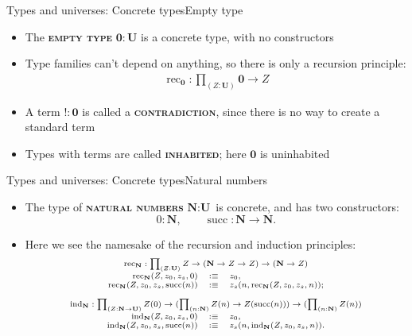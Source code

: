\documentclass{beamer}
\newcommand{\defn}[1]{{\scshape\bfseries\color{MPBemph}#1}}
\newcommand{\eql}{\mathbin{:\equiv}}
\newcommand{\U}{\textbf{U}}
\newcommand{\tpi}[1]{\prod_{(#1)}}
\DeclareMathOperator{\rec}{rec}
\DeclareMathOperator{\ind}{ind}
\newcommand{\1}{\textbf{1}}
\newcommand{\0}{\mathbf{0}}
\newcommand{\2}{\textbf{2}}
\newcommand{\N}{\textbf{N}}
\renewcommand{\succ}{\operatorname{succ}}
\begin{document}
\begin{frame}{Types and universes: Concrete types}{Empty type}
\begin{itemize}[<+- >]
	\item The \defn{empty type} \( \0 : \U \) is a concrete type, with no constructors
	\item Type families can't depend on anything, so there is only a recursion principle:
	\[ \begin{array}{c}
		\rec_{\0} : \tpi{Z : \U} \0 \to Z
	\end{array} \]
	\item A term \( {!} : \0 \) is called a \defn{contradiction}, since there is no way to create a standard term
	\item Types with terms are called \defn{inhabited}; here \( \0 \) is uninhabited
\end{itemize} \end{frame}
\begin{frame}{Types and universes: Concrete types}{Natural numbers}
\begin{itemize}[<+- >]
	\item The type of \defn{natural numbers} \( \N : \U \) is concrete, and has two constructors:
	\[ 0 : \N, \hspace{2em} \succ : \N \to \N. \]
	\item Here we see the namesake of the recursion and induction principles:
	\[\scriptsize \begin{array}{c}
		\rec_{\N} : \tpi{Z : \U} Z \to (\N \to Z \to Z) \to (\N \to Z) \\[3pt]
		\begin{array}{rcl}
			\rec_{\N}(Z, z_{0}, z_{s}, 0) &\eql& z_{0}, \\
			\rec_{\N}(Z, z_{0}, z_{s}, \succ(n)) &\eql& z_{s}(n, \rec_{\N}(Z, z_{0}, z_{s}, n));
		\end{array} \\[12pt]
		\ind_{\N} : \tpi{Z : \N \to \U} Z(0) \to (\tpi{n : \N} Z(n) \to Z(\succ(n))) \to (\tpi{n : \N} Z(n)) \\[3pt]
		\begin{array}{rcl}
			\ind_{\N}(Z, z_{0}, z_{s}, 0) &\eql& z_{0}, \\
			\ind_{\N}(Z, z_{0}, z_{s}, \succ(n)) &\eql& z_{s}(n, \ind_{\N}(Z, z_{0}, z_{s}, n)).
		\end{array}
	\end{array} \]
\end{itemize} \end{frame}
\end{document}
